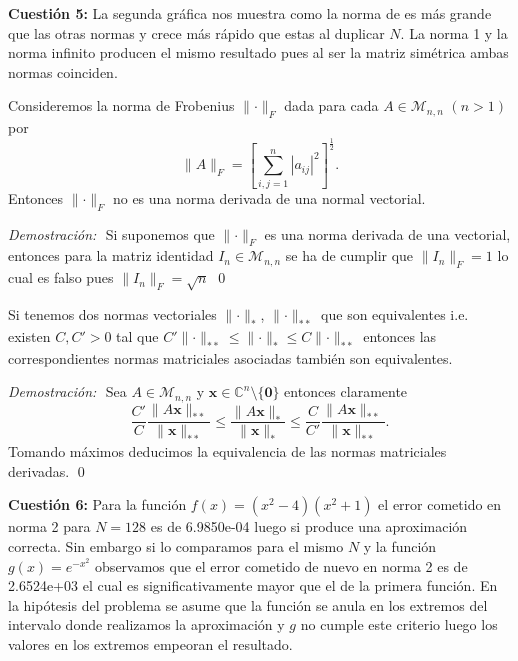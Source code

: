 \documentclass[12pt]{article}
\newcommand{\CC}{\mathds{C}}
\newcommand{\abs}[1]{\left|#1\right|}
\newcommand{\norm}[1]{\lVert #1\rVert}
\theoremstyle{definition}
\newenvironment{demostracion}{\noindent\textit{Demostración: } $ $ \newline}{\newline\qed}
\begin{document}
\noindent\textbf{Cuestión 5:} La segunda gráfica nos muestra como la norma de es más grande que las otras normas y crece más rápido que estas al duplicar $N$. La norma 1 y la norma infinito producen el mismo resultado pues al ser la matriz simétrica ambas normas coinciden.\\

\begin{lema}
	Consideremos la norma de Frobenius $\norm{\cdot}_F$ dada para cada $A\in\mathcal{M}_{n,n} $ $(n>1)$ por
	$$\norm{A}_F = \left[\sum_{i,j=1}^{n}\abs{a_{ij}}^2\right]^{\frac{1}{2}}.$$
	Entonces $\norm{\cdot}_F$ no es una norma derivada de una normal vectorial.
\end{lema}
\begin{demostracion}
	Si suponemos que $\norm{\cdot}_F$ es una norma derivada de una vectorial, entonces para la matriz identidad $I_n\in\mathcal{M}_{n,n}$ se ha de cumplir que $\norm{I_n}_F = 1$ lo cual es falso pues $\norm{I_n}_F = \sqrt{n}$
\end{demostracion}

\begin{lema}
	Si tenemos dos normas vectoriales $\norm{\cdot}_\ast$, $\norm{\cdot}_{\ast\ast}$ que son equivalentes i.e. existen $C, C'>0$ tal que $C'\norm{\cdot}_{\ast\ast}  \leq \norm{\cdot}_{\ast} \leq C \norm{\cdot}_{\ast\ast}$ entonces las correspondientes normas matriciales asociadas también son equivalentes.
\end{lema}

\begin{demostracion}
	Sea $A\in\mathcal{M}_{n,n}$ y $\bm{x}\in{\CC}^n\setminus\{\bm{0}\}$ entonces claramente
	$$\frac{C'}{C}\frac{\norm{A\bm{x}}_{\ast\ast}}{\norm{\bm{x}}_{\ast\ast}} \leq \frac{\norm{A \bm{x}}_\ast}{\norm{\bm{x}}_\ast} \leq \frac{C}{C'}\frac{\norm{A\bm{x}}_{\ast\ast}}{\norm{\bm{x}}_{\ast\ast}}.$$
	Tomando máximos deducimos la equivalencia de las normas matriciales derivadas.
\end{demostracion}

\noindent\textbf{Cuestión 6:} Para la función $f(x) = (x^2 - 4)(x^2 + 1)$ el error cometido en norma 2 para $N=128$ es de 6.9850e-04 luego si produce una aproximación correcta. Sin embargo si lo comparamos para el mismo $N$ y la función $g(x) = e^{-x^2}$ observamos que el error cometido de nuevo en norma 2 es de 2.6524e+03 el cual es significativamente mayor que el de la primera función. En la hipótesis del problema se asume que la función se anula en los extremos del intervalo donde realizamos la aproximación y $g$ no cumple este criterio luego los valores en los extremos empeoran el resultado. 
\end{document}
